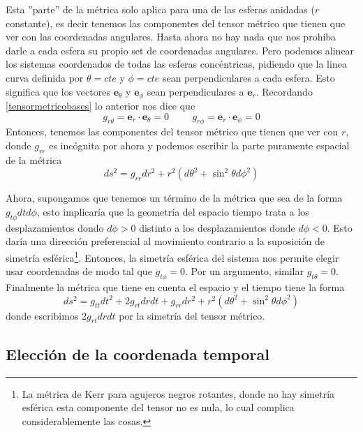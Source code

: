 Esta ''parte'' de la métrica solo aplica para una de las esferas anidadas ($r$ constante), es decir tenemos las componentes del tensor métrico que tienen que ver con las coordenadas angulares. Hasta ahora no hay nada que nos prohiba darle a cada esfera su propio set de coordenadas angulares. Pero podemos alinear los sistemas coordenados de todas las esferas concéntricas, pidiendo que la linea curva definida por $\theta = cte$ y $\phi=cte$ sean perpendiculares a cada esfera. Esto significa que los vectores $\bm{e}_\theta$ y $\bm{e}_\phi$ sean perpendiculares a $\bm{e}_r$. Recordando \ref{tensormetricobases} lo anterior nos dice que
\begin{equation*}
    g_{r\theta} = \bm{e}_r  \cdot \bm{e}_\theta = 0 \hspace{1cm} g_{r\phi} = \bm{e}_r  \cdot \bm{e}_\phi =0
\end{equation*}
Entonces, tenemos las componentes del tensor métrico que tienen que ver con $r$, donde $g_{rr}$ es incógnita por ahora y podemos escribir la parte puramente espacial de la métrica
\begin{equation}
    ds^2 = g_{rr}dr^2 + r^2(d\theta^2+\sin^2{\theta}d\phi^2)
    \label{metricaRN2}
\end{equation}

Ahora, supongamos que tenemos un término de la métrica que sea de la forma $g_{t\phi}dtd\phi$, esto implicaría que la geometría del espacio tiempo trata a los desplazamientos dondo $d\phi > 0$ distinto a los desplazamientos donde $d\phi <0$. Esto daría una dirección preferencial al movimiento contrario a la suposición de simetría esférica\footnote{La métrica de Kerr para agujeros negros rotantes, donde no hay simetría esférica esta componente del tensor no es nula, lo cual complica considerablemente las cosas.}. Entonces, la simetría esférica del sistema nos permite elegir usar coordenadas de modo tal que $g_{t\phi}=0$. Por un argumento, similar $g_{t\theta}=0$. Finalmente la métrica que tiene en cuenta el espacio y el tiempo tiene la forma 
\begin{equation}
    ds^2 = g_{tt}dt^2 + 2g_{rt}drdt +g_{rr}dr^2 + r^2(d\theta^2+\sin^2{\theta}d\phi^2)
\end{equation}
donde escribimos $2g_{rt}drdt$ por la simetría del tensor métrico. 

\subsection*{\textbf{Elección de la coordenada temporal}}

